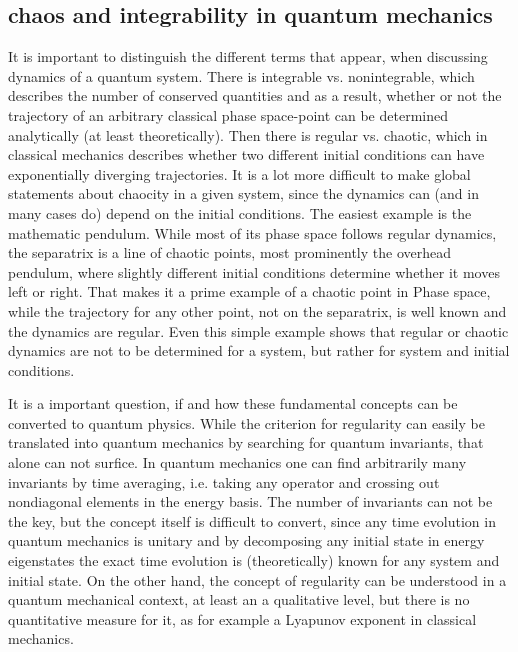 \subsection{chaos and integrability in quantum mechanics}
It is important to distinguish the different terms that appear, when discussing dynamics of a quantum system. 
There is integrable vs. nonintegrable, which describes the number of conserved quantities and as a result, whether or not the trajectory of an arbitrary classical phase space-point can be determined analytically (at least theoretically).
Then there is regular vs. chaotic, which in classical mechanics describes whether two different initial conditions can have exponentially diverging trajectories. 
It is a lot more difficult to make global statements about chaocity in a given system, since the dynamics can (and in many cases do) depend on the initial conditions.
The easiest example is the mathematic pendulum.
While most of its phase space follows regular dynamics, the separatrix is a line of chaotic points, most prominently the overhead pendulum, where slightly different initial conditions determine whether it moves left or right. 
That makes it a prime example of a chaotic point in Phase space, while the trajectory for any other point, not on the separatrix, is well known and the dynamics are regular.
Even this simple example shows that regular or chaotic dynamics are not to be determined for a system, but rather for system and initial conditions.

It is a important question, if and how these fundamental concepts can be converted to quantum physics.
While the criterion for regularity can easily be translated into quantum mechanics by searching for quantum invariants, that alone can not surfice.
In quantum mechanics one can find arbitrarily many invariants by time averaging, i.e. taking any operator and crossing out nondiagonal elements in the energy basis.
The number of invariants can not be the key, but the concept itself is difficult to convert, since any time evolution in quantum mechanics is unitary and by decomposing any initial state in energy eigenstates the exact time evolution is (theoretically) known for any system and initial state.
On the other hand, the concept of regularity can be understood in a quantum mechanical context, at least an a qualitative level, but there is no quantitative measure for it, as for example a Lyapunov exponent in classical mechanics.

